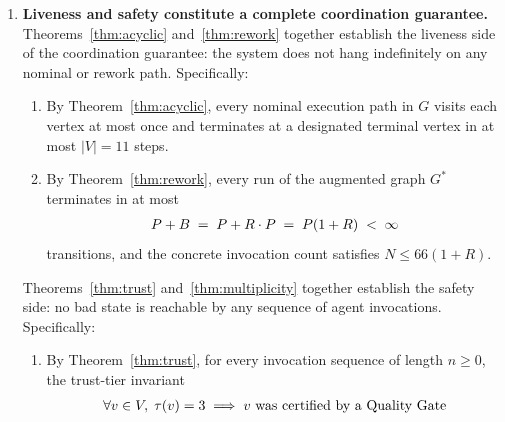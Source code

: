 \documentclass[12pt]{article}
\theoremstyle{definition}
\begin{document}
\begin{enumerate}

    \item \textbf{Liveness and safety constitute a complete coordination
          guarantee.}
          Theorems~\ref{thm:acyclic} and~\ref{thm:rework} together
          establish the liveness side of the coordination guarantee:
          the system does not hang indefinitely on any nominal or
          rework path.
          Specifically:
          \begin{enumerate}
              \item[S1a.] By Theorem~\ref{thm:acyclic}, every nominal
                          execution path in $G$ visits each vertex at
                          most once and terminates at a designated
                          terminal vertex in at most $|V| = 11$ steps.
              \item[S1b.] By Theorem~\ref{thm:rework}, every run of
                          the augmented graph $G^{*}$ terminates in
                          at most
                          \begin{align}
                              P + B
                              \;=\;
                              P + R \cdot P
                              \;=\;
                              P(1 + R)
                              \;<\; \infty
                              \notag
                          \end{align}
                          transitions, and the concrete invocation
                          count satisfies $N \leq 66(1+R)$.
          \end{enumerate}
          Theorems~\ref{thm:trust} and~\ref{thm:multiplicity} together
          establish the safety side: no bad state is reachable by any
          sequence of agent invocations.
          Specifically:
          \begin{enumerate}
              \item[S2a.] By Theorem~\ref{thm:trust}, for every
                          invocation sequence of length $n \geq 0$, the
                          trust-tier invariant
                          \begin{align}
                              \forall v \in V,\;
                              \tau(v) = 3
                              \;\Longrightarrow\;
                              v\text{ was certified by a Quality Gate}
                              \notag
                          \end{align}

\end{enumerate}
\end{enumerate}
\end{document}
